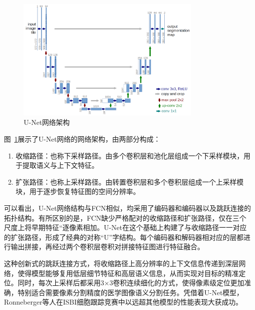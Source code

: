 \begin{figure}[htbp]
    \centering
    \includegraphics[width=0.8\textwidth]{fig/u-net-architecture.png}
    \caption{U-Net网络架构\cite{ronneberger2015}}
    \label{fig:unet_frame}
\end{figure}

图~\ref{fig:unet_frame}展示了U-Net网络的网络架构，由两部分构成：

\begin{enumerate}
    \item 收缩路径：也称下采样路径。由多个卷积层和池化层组成一个下采样模块，用于提取语义与上下文特征。
    \item 扩张路径：也称上采样路径。由转置卷积层和多个卷积层组成一个上采样模块，用于逐步恢复特征图的空间分辨率。
\end{enumerate}

可以看出，U-Net网络结构与FCN相似，均采用了编码器和编码器以及跳跃连接的拓扑结构。有所区别的是，FCN缺少严格配对的收缩路径和扩张路径，仅在三个尺度上将早期特征“逐像素相加。U-Net在这个基础上构建了与收缩路径一一对应的扩张路径，形成了经典的对称“U”字结构。每个编码器和解码器相对应的层都进行输出拼接，再经过两个卷积层卷积对拼接特征图进行特征融合。

这种创新式的跳跃连接方式，将收缩路径上高分辨率的上下文信息传递到深层网络，使得模型能够复用低层细节特征和高层语义信息，从而实现对目标的精准定位。同时，每次上采样后都采用3×3卷积连续细化的方式，使得像素级定位更加准确，特别适合需要像素分割精度的医学图像语义分割任务。凭借着U-Net模型，Ronneberger等人在ISBI细胞跟踪竞赛中以远超其他模型的性能表现大获成功\cite{ronneberger2015}。
